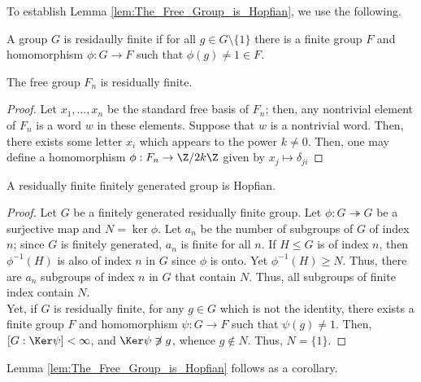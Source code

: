 \documentclass[12pt]{article}
\begin{document}
To establish Lemma \ref{lem:The_Free_Group_is_Hopfian}, we use the following.

\begin{definition}\label{def:Residually_Finite}
    A group $G$ is residaully finite if for all $g \in G \setminus \{1\}$ there is a finite group $F$ and homomorphism $\phi: G \rightarrow F$ such that $\phi(g) \neq 1 \in F$.
\end{definition}

\begin{lemma}\label{lem:The_Free_Group_is_Residually_Finite}
    The free group $F_n$ is residually finite.
\end{lemma}
\begin{proof}
    Let $x_1, \ldots, x_n$ be the standard free basis of $F_n$; then, any nontrivial element of $F_n$ is a word $w$ in these elements. 
    Suppose that $w$ is a nontrivial word. Then, there exists some letter $x_i$ which appears to the power $k \neq 0$. Then, one may define a homomorphism $\phi: F_n \rightarrow \Z/2k\Z$ given by $x_j \mapsto \delta_{ji}$
\end{proof}

\begin{proposition}\label{prop:Residaully_Finite_is_Hopfian}
    A residually finite finitely generated group is Hopfian.
\end{proposition}
\begin{proof}
    Let $G$ be a finitely generated residually finite group. Let $\phi: G \twoheadrightarrow G$ be a surjective map and $N = \ker \phi$. Let $a_n$ be the number of subgroups of $G$ of index $n$; since $G$ is finitely generated, $a_n$ is finite for all $n$. If $H \leq G$ is of index $n$, then $\phi^{-1}(H)$ is also of index $n$ in $G$ since $\phi$ is onto. Yet $\phi^{-1}(H) \geq N$. Thus, there are $a_n$ subgroups of index $n$ in $G$ that contain $N$. Thus, all subgroups of finite index contain $N$.\\

    Yet, if $G$ is residually finite, for any $g \in G$ which is not the identity, there exists a finite group $F$ and homomorphism $\psi: G \rightarrow F$ such that $\psi(g) \neq 1$. Then, $[G: \Ker \psi] < \infty$, and $\Ker \psi \not\ni g$, whence $g \not\in N$. Thus, $N = \{1\}$.
\end{proof}

Lemma \ref{lem:The_Free_Group_is_Hopfian} follows as a corollary.
\end{document}
